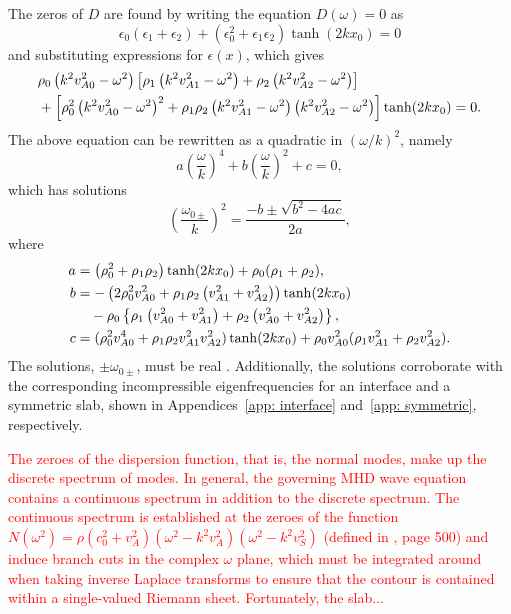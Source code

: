\documentclass[12pt]{../style-files/ociamthesis}
\begin{document}
The zeros of $D$ are found by writing the equation $D(\omega) = 0$ as
\begin{equation}
\epsilon_0(\epsilon_1 + \epsilon_2) + \left(\epsilon_0^2 + \epsilon_1\epsilon_2\right)\tanh(2kx_0) = 0
\end{equation}
and substituting expressions for $\epsilon(x)$, which gives
\begin{align}
&\rho_0\left(k^2v_{A0}^2 - \omega^2\right)\left[\rho_1\left(k^2v_{A1}^2 - \omega^2\right) + \rho_2\left(k^2v_{A2}^2 - \omega^2\right)\right] \notag \\
&+ \left[\rho_0^2\left(k^2v_{A0}^2 - \omega^2\right)^2 + \rho_1\rho_2\left(k^2v_{A1}^2 - \omega^2\right)\left(k^2v_{A2}^2 - \omega^2\right)\right]\tanh(2kx_0) = 0.
\end{align}
The above equation can be rewritten as a quadratic in $(\omega/k)^2$, namely
\begin{equation}
a \left(\frac{\omega}{k}\right)^4 + b \left(\frac{\omega}{k}\right)^2 + c = 0,
\end{equation}
which has solutions
\begin{equation}
\left(\frac{\omega_{0\pm}}{k}\right)^2 = \frac{-b \pm \sqrt{b^2 - 4ac}}{2a},
\end{equation}
where
\begin{align}
a &= \left(\rho_0^2 + \rho_1\rho_2\right)\tanh(2kx_0) + \rho_0(\rho_1 + \rho_2), \label{solution a} \\
b &= -\left(2\rho_0^2v_{A0}^2 + \rho_1\rho_2\left(v_{A1}^2 + v_{A2}^2\right)\right)\tanh(2kx_0) \notag \\
& \quad - \rho_0 \left\{ \rho_1\left(v_{A0}^2 + v_{A1}^2\right) + \rho_2\left(v_{A0}^2 + v_{A2}^2\right) \right\}, \label{solution b} \\
c &= (\rho_0^2v_{A0}^4 + \rho_1\rho_2v_{A1}^2v_{A2}^2)\tanh(2kx_0) + \rho_0v_{A0}^2(\rho_1v_{A1}^2 + \rho_2v_{A2}^2). \label{solution c}
\end{align}
The solutions, $\pm\omega_{0\pm}$, must be real \citep{goe_etal04}. Additionally, the solutions corroborate with the corresponding incompressible eigenfrequencies for an interface and a symmetric slab, shown in Appendices~\ref{app: interface} and~\ref{app: symmetric}, respectively.

\textcolor{red}{
The zeroes of the dispersion function, that is, the normal modes, make up the discrete spectrum of modes. In general, the governing MHD wave equation contains a continuous spectrum in addition to the discrete spectrum. The continuous spectrum is established at the zeroes of the function $N(\omega^2) = \rho (c_0^2 + v_A^2)(\omega^2 - k^2v_A^2)(\omega^2 - k^2v_S^2)$ (defined in \cite{goe_etal04}, page 500) and induce branch cuts in the complex $\omega$ plane, which must be integrated around when taking inverse Laplace transforms to ensure that the contour is contained within a single-valued Riemann sheet. Fortunately, the slab...}
\end{document}
